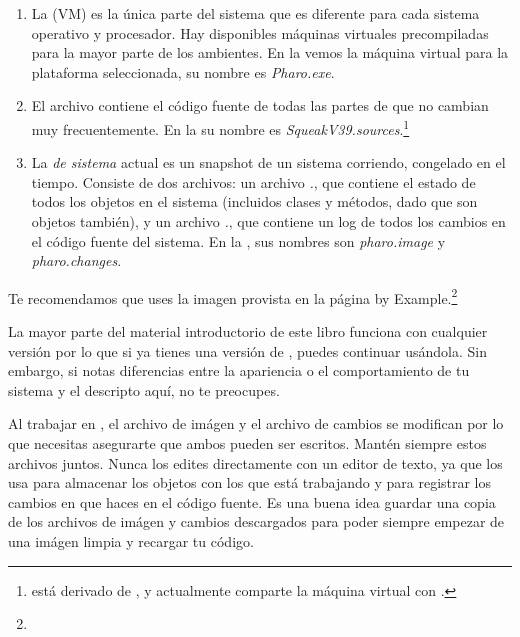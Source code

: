 \documentclass[a4paper,10pt,twoside]{book}
\begin{document}
\begin{enumerate}

  \item La  (VM) es la \'unica parte del sistema que es diferente para cada sistema operativo y procesador. Hay disponibles m\'aquinas virtuales precompiladas para la mayor parte de los ambientes. En la  vemos la m\'aquina virtual para la plataforma seleccionada, su nombre es \textit{Pharo.exe}.

  \item El archivo  contiene el c\'odigo fuente de todas las partes de \pharo que no cambian muy frecuentemente. En la  su nombre es \emph{SqueakV39.sources}.\footnote{\pharo est\'a derivado de , y actualmente comparte la m\'aquina virtual con \squeak.}

  \item La \emph{ de sistema} actual es un snapshot de un sistema \pharo corriendo, congelado en el tiempo. Consiste de dos archivos: un archivo  \emph{.}, que contiene el estado de todos los objetos en el sistema (incluidos clases y m\'etodos, dado que son objetos tambi\'en), y un archivo \emph{.}, que contiene un log de todos los cambios en el c\'odigo fuente del sistema.
En la , sus nombres son \emph{pharo.image} y \emph{pharo.changes}.
\end{enumerate}

Te recomendamos que uses la imagen provista en la p\'agina \pharo by Example.\footnote{\pbe}

La mayor parte del material introductorio de este libro funciona con cualquier versi\'on por lo que si ya tienes una versi\'on de \pharo, puedes continuar us\'andola.
Sin embargo, si notas diferencias entre la apariencia o el comportamiento de tu sistema y el descripto aqu\'i, no te preocupes.

Al trabajar en \pharo, el archivo de im\'agen y el archivo de cambios se modifican por lo que necesitas asegurarte que ambos pueden ser escritos.
Mant\'en siempre estos archivos juntos.
Nunca los edites directamente con un editor de texto, ya que \pharo los usa para almacenar los objetos con los que est\'a trabajando y para registrar los cambios en que haces en el c\'odigo fuente.
Es una buena idea guardar una copia de los archivos de im\'agen y cambios descargados para poder siempre empezar de una im\'agen limpia y recargar tu c\'odigo.
\end{document}
